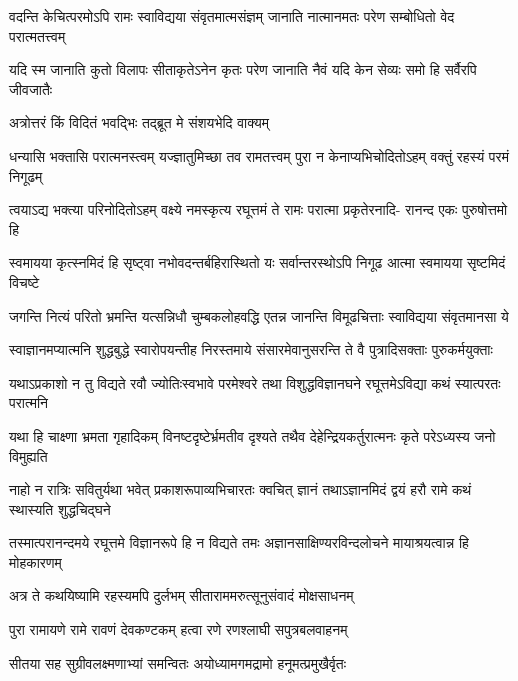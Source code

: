 \fourlineindentedshloka
{वदन्ति केचित्परमोऽपि रामः}
{स्वाविद्यया संवृतमात्मसंज्ञम्}
{जानाति नात्मानमतः परेण}
{सम्बोधितो वेद परात्मतत्त्वम्} %

\fourlineindentedshloka
{यदि स्म जानाति कुतो विलापः}
{सीताकृतेऽनेन कृतः परेण}
{जानाति नैवं यदि केन सेव्यः}
{समो हि सर्वैरपि जीवजातैः} %

\twolineshloka
{अत्रोत्तरं किं विदितं भवद्भिः}
{तद्ब्रूत मे संशयभेदि वाक्यम्} %


\fourlineindentedshloka
{धन्यासि भक्तासि परात्मनस्त्वम्}
{यज्ज्ञातुमिच्छा तव रामतत्त्वम्}
{पुरा न केनाप्यभिचोदितोऽहम्}
{वक्तुं रहस्यं परमं निगूढम्} %

\fourlineindentedshloka
{त्वयाऽद्य भक्त्या परिनोदितोऽहम्}
{वक्ष्ये नमस्कृत्य रघूत्तमं ते}
{रामः परात्मा प्रकृतेरनादि-}
{रानन्द एकः पुरुषोत्तमो हि} %

\fourlineindentedshloka
{स्वमायया कृत्स्नमिदं हि सृष्ट्वा}
{नभोवदन्तर्बहिरास्थितो यः}
{सर्वान्तरस्थोऽपि निगूढ आत्मा}
{स्वमायया सृष्टमिदं विचष्टे} %

\fourlineindentedshloka
{जगन्ति नित्यं परितो भ्रमन्ति}
{यत्सन्निधौ चुम्बकलोहवद्धि}
{एतन्न जानन्ति विमूढचित्ताः}
{स्वाविद्यया संवृतमानसा ये} %

\fourlineindentedshloka
{स्वाज्ञानमप्यात्मनि शुद्धबुद्धे}
{स्वारोपयन्तीह निरस्तमाये}
{संसारमेवानुसरन्ति ते वै}
{पुत्रादिसक्ताः पुरुकर्मयुक्ताः} %

\fourlineindentedshloka
{यथाऽप्रकाशो न तु विद्यते रवौ}
{ज्योतिःस्वभावे परमेश्वरे तथा}
{विशुद्धविज्ञानघने रघूत्तमेऽविद्या}
{कथं स्यात्परतः परात्मनि} %

\fourlineindentedshloka
{यथा हि चाक्ष्णा भ्रमता गृहादिकम्}
{विनष्टदृष्टेर्भ्रमतीव दृश्यते}
{तथैव देहेन्द्रियकर्तुरात्मनः}
{कृते परेऽध्यस्य जनो विमुह्यति} %

\fourlineindentedshloka
{नाहो न रात्रिः सवितुर्यथा भवेत्}
{प्रकाशरूपाव्यभिचारतः क्वचित्}
{ज्ञानं तथाऽज्ञानमिदं द्वयं हरौ}
{रामे कथं स्थास्यति शुद्धचिद्घने} %

\fourlineindentedshloka
{तस्मात्परानन्दमये रघूत्तमे}
{विज्ञानरूपे हि न विद्यते तमः}
{अज्ञानसाक्षिण्यरविन्दलोचने}
{मायाश्रयत्वान्न हि मोहकारणम्} %

\twolineshloka
{अत्र ते कथयिष्यामि रहस्यमपि दुर्लभम्}
{सीताराममरुत्सूनुसंवादं मोक्षसाधनम्} %

\twolineshloka
{पुरा रामायणे रामे रावणं देवकण्टकम्}
{हत्वा रणे रणश्लाघी सपुत्रबलवाहनम्} %

\twolineshloka
{सीतया सह सुग्रीवलक्ष्मणाभ्यां समन्वितः}
{अयोध्यामगमद्रामो हनूमत्प्रमुखैर्वृतः} %

